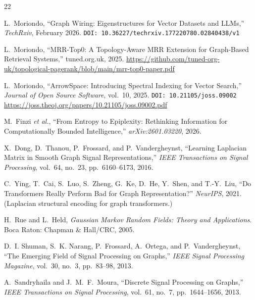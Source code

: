 \documentclass[12pt,a4paper]{article}
\theoremstyle{plain}
\theoremstyle{definition}
\theoremstyle{remark}
\newcommand{\1}{\mathbf{1}}
\begin{document}
	\begin{thebibliography}{22}
		
		L.~Moriondo,
		``Graph Wiring: Eigenstructures for Vector Datasets and LLMs,''
		\emph{TechRxiv}, February 2026.
		\newblock \texttt{DOI: 10.36227/techrxiv.177220780.02840438/v1}
		
		L.~Moriondo,
		``MRR-Top0: A Topology-Aware MRR Extension for Graph-Based Retrieval
		Systems,''
		tuned.org.uk, 2025.
		\newblock \url{https://github.com/tuned-org-uk/topological-pagerank/blob/main/mrr-top0-paper.pdf}
		
		L.~Moriondo,
		``ArrowSpace: Introducing Spectral Indexing for Vector Search,''
		\emph{Journal of Open Source Software}, vol.~10, 2025.
		\newblock \texttt{DOI: 10.21105/joss.09002}
		\newblock \url{https://joss.theoj.org/papers/10.21105/joss.09002.pdf}
		
		M.~Finzi \emph{et al.},
		``From Entropy to Epiplexity: Rethinking Information for Computationally
		Bounded Intelligence,''
		\emph{arXiv:2601.03220}, 2026.
		
		X.~Dong, D.~Thanou, P.~Frossard, and P.~Vandergheynst,
		``Learning Laplacian Matrix in Smooth Graph Signal Representations,''
		\emph{IEEE Transactions on Signal Processing},
		vol.~64, no.~23, pp.~6160--6173, 2016.
		
		C.~Ying, T.~Cai, S.~Luo, S.~Zheng, G.~Ke, D.~He, Y.~Shen,
		and T.-Y.~Liu,
		``Do Transformers Really Perform Bad for Graph Representation?''
		\emph{NeurIPS}, 2021.
		\newblock (Laplacian structural encoding for graph transformers.)
		
		H.~Rue and L.~Held,
		\emph{Gaussian Markov Random Fields: Theory and Applications}.
		Boca Raton: Chapman \& Hall/CRC, 2005.
		
		D.~I. Shuman, S.~K. Narang, P.~Frossard, A.~Ortega,
		and P.~Vandergheynst,
		``The Emerging Field of Signal Processing on Graphs,''
		\emph{IEEE Signal Processing Magazine},
		vol.~30, no.~3, pp.~83--98, 2013.
		
		A.~Sandryhaila and J.~M.~F.~Moura,
		``Discrete Signal Processing on Graphs,''
		\emph{IEEE Transactions on Signal Processing},
		vol.~61, no.~7, pp.~1644--1656, 2013.
		

\end{thebibliography}
\end{document}
